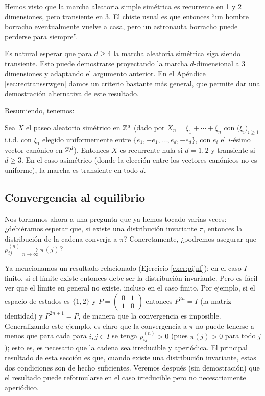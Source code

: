 Hemos visto que la marcha aleatoria simple simétrica es recurrente en 1 y 2 dimensiones, pero transiente en 3.
El chiste usual es que entonces ``un hombre borracho eventualmente vuelve a casa, pero un astronauta borracho puede perderse para siempre''.

Es natural esperar que para $d\geq4$ la marcha aleatoria simétrica siga siendo transiente.
Esto puede demostrarse proyectando la marcha $d$-dimensional a 3 dimensiones y adaptando el argumento anterior.
En el Apéndice \ref{sec:rectranssrwgen} damos un criterio bastante más general, que permite dar una demostración alternativa de este resultado.

Resumiendo, tenemos:

\begin{thm}\label{thm:recSRW}
Sea $X$ el paseo aleatorio simétrico en $\mathbb{Z}^d$ (dado por $X_n=\xi_1+\dotsm+\xi_n$ con $\big(\xi_i\big)_{i\geq1}$ i.i.d. con $\xi_1$ elegido uniformemente entre $\{e_1,-e_1,\dotsc,e_d,-e_d\}$, con $e_i$ el $i$-ésimo vector canónico en $\mathbb{Z}^d$).
Entonces $X$ es recurrente nula si $d=1,2$ y transiente si $d\geq3$.
En el caso asimétrico (donde la elección entre los vectores canónicos no es uniforme), la marcha es transiente en todo $d$.
\end{thm}

\subsection{Convergencia al equilibrio}

Nos tornamos ahora a una pregunta que ya hemos tocado varias veces: ¿debiéramos esperar que, si existe una distribución invariante $\pi$, entonces la distribución de la cadena converja a $\pi$?
Concretamente, ¿podremos asegurar que $p^{(n)}_{ij}\xrightarrow[n\to\infty]{}\pi(j)$?

Ya mencionamos un resultado relacionado (Ejercicio \ref{exer:pijnf}): en el caso $I$ finito, si el límite existe entonces debe ser la distribución invariante.
Pero es fácil ver que el límite en general no existe, incluso en el caso finito.
Por ejemplo, si el espacio de estados es $\{1,2\}$ y $P=\left(\begin{smallmatrix}0 & 1\\1 & 0\end{smallmatrix}\right)$ entonces $P^{2n}=I$ (la matriz identidad) y $P^{2n+1}=P$, de manera que la convergencia es imposible.
Generalizando este ejemplo, es claro que la convergencia a $\pi$ no puede tenerse a menos que para cada para $i,j\in I$ se tenga $p^{(n)}_{ij}>0$ (pues $\pi(j)>0$ para todo $j$); esto es, es necesario que la cadena sea irreducible y aperiódica.
El principal resultado de esta sección es que, cuando existe una distribución invariante, estas dos condiciones son de hecho suficientes.
Veremos después (sin demostración) que el resultado puede reformularse en el caso irreducible pero no necesariamente aperiódico.

